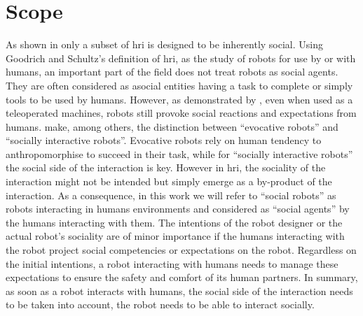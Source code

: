 \section{Scope}\label{sec:intro_scope}

As shown in \cite{goodrich2007human} only a subset of \gls{hri} is designed to be inherently social. Using Goodrich and Schultz's definition of \gls{hri}, as the study of robots for use by or with humans, an important part of the field does not treat robots as social agents. They are often considered as asocial entities having a task to complete or simply tools to be used by humans. However, as demonstrated by \cite{fincannon2004evidence}, even when used as a teleoperated machines, robots still provoke social reactions and expectations from humans. \cite{fong2003survey} make, among others, the distinction between ``evocative robots'' and ``socially interactive robots''. Evocative robots rely on human tendency to anthropomorphise to succeed in their task, while for ``socially interactive robots'' the social side of the interaction is key. However in \gls{hri}, the sociality of the interaction might not be intended but simply emerge as a by-product of the interaction. As a consequence, in this work we will refer to ``social robots'' as robots interacting in humans environments and considered as ``social agents'' by the humans interacting with them. The intentions of the robot designer or the actual robot's sociality are of minor importance if the humans interacting with the robot project social competencies or expectations on the robot. Regardless on the initial intentions, a robot interacting with humans needs to manage these expectations to ensure the safety and comfort of its human partners. In summary, as soon as a robot interacts with humans, the social side of the interaction needs to be taken into account, the robot needs to be able to interact socially. 


